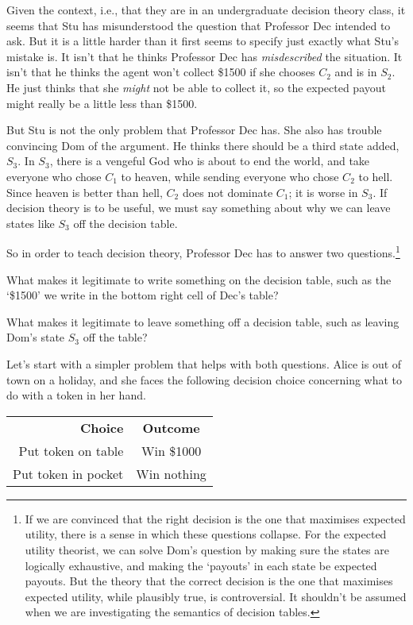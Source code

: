 Given the context, i.e., that they are in an undergraduate decision theory class, it seems that Stu has misunderstood the question that Professor Dec intended to ask. But it is a little harder than it first seems to specify just exactly what Stu's mistake is. It isn't that he thinks Professor Dec has \textit{misdescribed} the situation. It isn't that he thinks the agent won't collect \$1500 if she chooses $C_2$ and is in $S_2$. He just thinks that she \textit{might} not be able to collect it, so the expected payout might really be a little less than \$1500.

But Stu is not the only problem that Professor Dec has. She also has trouble convincing Dom of the argument. He thinks there should be a third state added, $S_3$. In $S_3$, there is a vengeful God who is about to end the world, and take everyone who chose $C_1$ to heaven, while sending everyone who chose $C_2$ to hell. Since heaven is better than hell, $C_2$ does not dominate $C_1$; it is worse in $S_3$. If decision theory is to be useful, we must say something about why we can leave states like $S_3$ off the decision table.

So in order to teach decision theory, Professor Dec has to answer two questions.\footnote{If we are convinced that the right decision is the one that maximises expected utility, there is a sense in which these questions collapse. For the expected utility theorist, we can solve Dom's question by making sure the states are logically exhaustive, and making the `payouts' in each state be expected payouts. But the theory that the correct decision is the one that maximises expected utility, while plausibly true, is controversial. It shouldn't be assumed when we are investigating the semantics of decision tables.}

\begin{enumerate*}
\item What makes it legitimate to write something on the decision table, such as the `\$1500' we write in the bottom right cell of Dec's table?
\item What makes it legitimate to leave something off a decision table, such as leaving Dom's state $S_3$ off the table?
\end{enumerate*}

\noindent Let's start with a simpler problem that helps with both questions. Alice is out of town on a holiday, and she faces the following decision choice concerning what to do with a token in her hand.

\begin{center}
\begin{tabular}{r c}
\textbf{Choice} & \textbf{Outcome} \\
Put token on table & Win \$1000 \\
Put token in pocket & Win nothing
\end{tabular}
\end{center}

